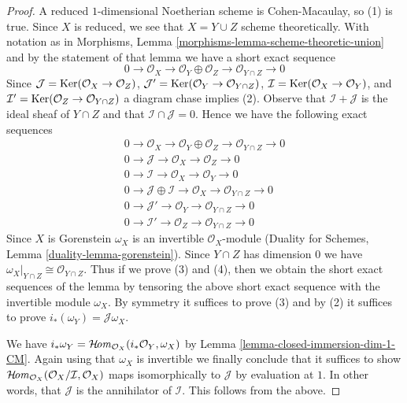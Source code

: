 \begin{proof}
A reduced $1$-dimensional Noetherian scheme is Cohen-Macaulay, so
(1) is true. Since $X$ is reduced, we see that $X = Y \cup Z$
scheme theoretically. With notation as in
Morphisms, Lemma \ref{morphisms-lemma-scheme-theoretic-union}
and by the statement of that lemma
we have a short exact sequence
$$
0 \to \mathcal{O}_X \to
\mathcal{O}_Y \oplus \mathcal{O}_Z \to \mathcal{O}_{Y \cap Z} \to 0
$$
Since $\mathcal{J} = \mathop{\mathrm{Ker}}(\mathcal{O}_X \to \mathcal{O}_Z)$,
$\mathcal{J}' = \mathop{\mathrm{Ker}}(\mathcal{O}_Y \to \mathcal{O}_{Y \cap Z})$,
$\mathcal{I} = \mathop{\mathrm{Ker}}(\mathcal{O}_X \to \mathcal{O}_Y)$, and
$\mathcal{I}' = \mathop{\mathrm{Ker}}(\mathcal{O}_Z \to \mathcal{O}_{Y \cap Z})$
a diagram chase implies (2).
Observe that $\mathcal{I} + \mathcal{J}$ is the ideal sheaf
of $Y \cap Z$ and that $\mathcal{I} \cap \mathcal{J} = 0$.
Hence we have the following exact sequences
\begin{align*}
0 \to \mathcal{O}_X \to \mathcal{O}_Y \oplus \mathcal{O}_Z \to
\mathcal{O}_{Y \cap Z} \to 0 \\
0 \to \mathcal{J} \to \mathcal{O}_X \to \mathcal{O}_Z \to 0 \\
0 \to \mathcal{I} \to \mathcal{O}_X \to \mathcal{O}_Y \to 0 \\
0 \to \mathcal{J} \oplus \mathcal{I} \to \mathcal{O}_X \to
\mathcal{O}_{Y \cap Z} \to 0 \\
0 \to \mathcal{J}' \to \mathcal{O}_Y \to \mathcal{O}_{Y \cap Z} \to 0 \\
0 \to \mathcal{I}' \to \mathcal{O}_Z \to \mathcal{O}_{Y \cap Z} \to 0
\end{align*}
Since $X$ is Gorenstein $\omega_X$ is an invertible $\mathcal{O}_X$-module
(Duality for Schemes, Lemma \ref{duality-lemma-gorenstein}).
Since $Y \cap Z$ has dimension $0$ we have
$\omega_X|_{Y \cap Z} \cong \mathcal{O}_{Y \cap Z}$.
Thus if we prove (3) and (4), then we obtain the short exact
sequences of the lemma by tensoring the above
short exact sequence with the invertible module $\omega_X$.
By symmetry it suffices to prove (3) and by
(2) it suffices to prove $i_*(\omega_Y) = \mathcal{J}\omega_X$.

\medskip\noindent
We have
$i_*\omega_Y = \mathop{\mathcal{H}\!\mathit{om}}\nolimits_{\mathcal{O}_X}(i_*\mathcal{O}_Y, \omega_X)$
by Lemma \ref{lemma-closed-immersion-dim-1-CM}.
Again using that $\omega_X$ is invertible
we finally conclude that it suffices to show
$\mathop{\mathcal{H}\!\mathit{om}}\nolimits_{\mathcal{O}_X}(\mathcal{O}_X/\mathcal{I}, \mathcal{O}_X)$
maps isomorphically to $\mathcal{J}$ by evaluation at $1$.
In other words, that $\mathcal{J}$ is the annihilator of
$\mathcal{I}$. This follows from the above.
\end{proof}







